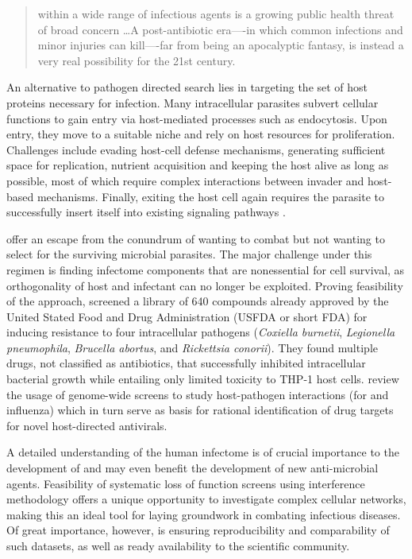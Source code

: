 \begin{quote}
 within a wide range of infectious agents is a growing public health threat of broad concern \ldots A post-antibiotic era—-in which common infections and minor injuries can kill—-far from being an apocalyptic fantasy, is instead a very real possibility for the 21st century.
\end{quote}

An alternative to pathogen directed search lies in targeting the set of host proteins necessary for infection. Many intracellular parasites subvert cellular functions to gain entry via host-mediated processes such as endocytosis. Upon entry, they move to a suitable niche and rely on host resources for proliferation. Challenges include evading host-cell defense mechanisms, generating sufficient space for replication, nutrient acquisition and keeping the host alive as long as possible, most of which require complex interactions between invader and host-based mechanisms. Finally, exiting the host cell again requires the parasite to successfully insert itself into existing signaling pathways \citep{Leiriao2004}.

 offer an escape from the conundrum of wanting to combat but not wanting to select for the surviving microbial parasites. The major challenge under this regimen is finding infectome components that are nonessential for cell survival, as orthogonality of host and infectant can no longer be exploited. Proving feasibility of the approach, \citeauthor{Czyz2014} screened a library of 640 compounds already approved by the United Stated Food and Drug Administration (USFDA or short FDA) for inducing resistance to four intracellular pathogens (\textit{Coxiella burnetii}, \textit{Legionella pneumophila}, \textit{Brucella abortus}, and \textit{Rickettsia conorii}). They found multiple drugs, not classified as antibiotics, that successfully inhibited intracellular bacterial growth while entailing only limited toxicity to THP-1 host cells. \citeauthor{Prussia2011} review the usage of genome-wide screens to study host-pathogen interactions (for  and influenza) which in turn serve as basis for rational identification of drug targets for novel host-directed antivirals. \nocite{Hawn2015}

A detailed understanding of the human infectome is of crucial importance to the development of  and may even benefit the development of new anti-microbial agents. Feasibility of systematic loss of function screens using  interference methodology offers a unique opportunity to investigate complex cellular networks, making this an ideal tool for laying groundwork in combating infectious diseases. Of great importance, however, is ensuring reproducibility and comparability of such datasets, as well as ready availability to the scientific community.

